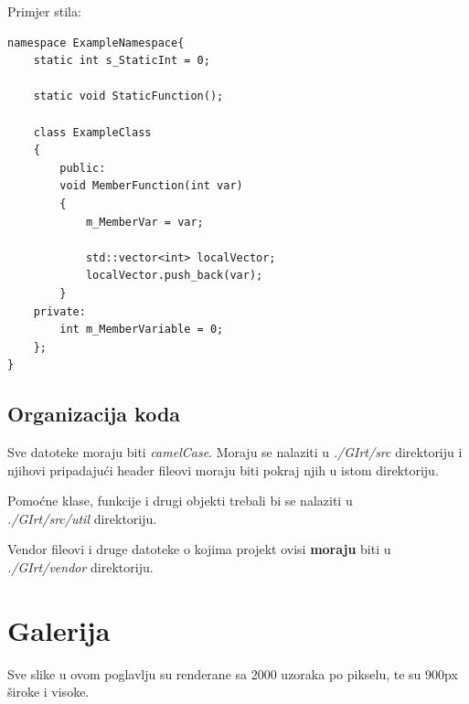 \documentclass[
12pt, %
oneside, %
english, %
singlespacing, %
parskip, %
headsepline, %
chapterinoneline, %
consistentlayout, %
]{MastersDoctoralThesis} %
\begin{document}
\vspace{2cm}

Primjer stila:
\begin{verbatim}
namespace ExampleNamespace{
    static int s_StaticInt = 0;

    static void StaticFunction();

    class ExampleClass
    {
        public:
        void MemberFunction(int var)
        {
            m_MemberVar = var;

            std::vector<int> localVector;
            localVector.push_back(var);
        }
    private:
        int m_MemberVariable = 0;
    };
}
\end{verbatim}

\section{Organizacija koda}
Sve datoteke moraju biti \emph{camelCase}. Moraju se nalaziti u \emph{./GIrt/src} direktoriju
i njihovi pripadajući header fileovi moraju biti pokraj njih u istom direktoriju.

Pomoćne klase, funkcije i drugi objekti trebali bi se nalaziti u \\
\emph{./GIrt/src/util} direktoriju.

Vendor fileovi i druge datoteke o kojima projekt ovisi \textbf{moraju} biti u \\
\emph{./GIrt/vendor}
direktoriju.




\chapter{Galerija}

Sve slike u ovom poglavlju su renderane sa 2000 uzoraka po pikselu, te su 900px široke i visoke.
\end{document}
